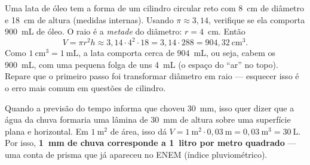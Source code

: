 \begin{center}
\end{center}

\begin{exemplo}
Uma lata de óleo tem a forma de um cilindro circular reto com 8~cm de diâmetro e
18~cm de altura (medidas internas). Usando $\pi \approx 3{,}14$, verifique se ela
comporta 900~mL de óleo.
\solucao
O raio é a \emph{metade} do diâmetro: $r = 4$~cm. Então
\[
V = \pi r^2 h \approx 3{,}14\cdot 4^2\cdot 18 = 3{,}14\cdot 288 = 904{,}32\ \text{cm}^3 .
\]
Como $1\ \text{cm}^3 = 1\ \text{mL}$, a lata comporta cerca de 904~mL, ou seja,
cabem os 900~mL, com uma pequena folga de uns 4~mL (o espaço do “ar” no topo).
Repare que o primeiro passo foi transformar diâmetro em raio — esquecer isso é
o erro mais comum em questões de cilindro.
\end{exemplo}

\begin{contexto}
Quando a previsão do tempo informa que choveu 30~mm, isso quer dizer que a água
da chuva formaria uma lâmina de 30~mm de altura sobre uma superfície plana e
horizontal. Em $1\ \text{m}^2$ de área, isso dá
$V = 1\ \text{m}^2\cdot 0{,}03\ \text{m} = 0{,}03\ \text{m}^3 = 30\ \text{L}$.
Por isso, \textbf{1~mm de chuva corresponde a 1~litro por metro quadrado} — uma
conta de prisma que já apareceu no ENEM (índice pluviométrico).
\end{contexto}

